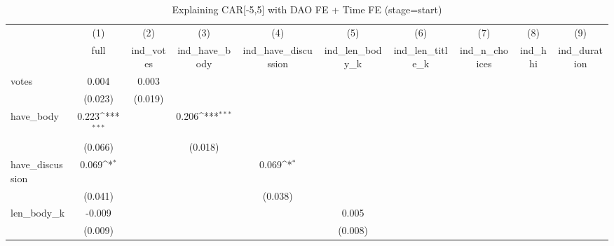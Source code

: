 \begin{table}[htbp]\centering
\def\sym#1{\ifmmode^{#1}\else\(^{#1}\)\fi}
\caption{Explaining CAR[-5,5] with DAO FE + Time FE (stage=start)}
\begin{tabular}{l*{9}{c}}
\hline\hline
          &\multicolumn{1}{c}{(1)}         &\multicolumn{1}{c}{(2)}         &\multicolumn{1}{c}{(3)}         &\multicolumn{1}{c}{(4)}         &\multicolumn{1}{c}{(5)}         &\multicolumn{1}{c}{(6)}         &\multicolumn{1}{c}{(7)}         &\multicolumn{1}{c}{(8)}         &\multicolumn{1}{c}{(9)}         \\
          &     full         &ind\_votes         &ind\_have\_body         &ind\_have\_discussion         &ind\_len\_body\_k         &ind\_len\_title\_k         &ind\_n\_choices         &  ind\_hhi         &ind\_duration         \\
\hline
votes     &    0.004         &    0.003         &                  &                  &                  &                  &                  &                  &                  \\
          &  (0.023)         &  (0.019)         &                  &                  &                  &                  &                  &                  &                  \\
have\_body &    0.223\sym{***}&                  &    0.206\sym{***}&                  &                  &                  &                  &                  &                  \\
          &  (0.066)         &                  &  (0.018)         &                  &                  &                  &                  &                  &                  \\
have\_discussion&    0.069\sym{*}  &                  &                  &    0.069\sym{*}  &                  &                  &                  &                  &                  \\
          &  (0.041)         &                  &                  &  (0.038)         &                  &                  &                  &                  &                  \\
len\_body\_k&   -0.009         &                  &                  &                  &    0.005         &                  &                  &                  &                  \\
          &  (0.009)         &                  &                  &                  &  (0.008)         &                  &                  &                  &                  \\

\end{tabular}
\end{table}
